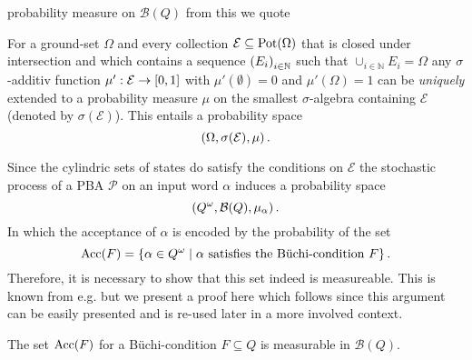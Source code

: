 probability measure on $\mathcal{B}(Q)$ from this we quote
\begin{theorem}
  \cite[Theorem 2.4, Theorem 5.6]{Bauer}
  For a ground-set $\Omega$ and every collection
  $\mathcal{E}\subseteq\operatorname{Pot}(\Omega)$ that is closed under intersection and
  which contains a sequence $\left(E_{i}\right)_{i\in\mathbb{N}}$ such that
  $\cup_{i\in\mathbb{N}}E_{i} = \Omega$ any $\sigma$-additiv function
  $\mu':\mathcal{E}\rightarrow\left[0, 1\right]$
  with $\mu'(\emptyset) = 0$ and $\mu'(\Omega) = 1$ can be \emph{uniquely}
  extended to a probability measure $\mu$ on the smallest $\sigma$-algebra
  containing $\mathcal{E}$ (denoted by $\sigma(\mathcal{E})$). This entails a
  probability space
  \begin{equation*}
    \left(\Omega, \sigma(\mathcal{E}), \mu\right).
  \end{equation*}
  \label{thm:measureext}
\end{theorem}
Since the cylindric sets of states do satisfy the conditions on $\mathcal{E}$
the stochastic process of a \ac{PBA} $\mathcal{P}$ on an input word $\alpha$
induces a probability space
\begin{equation*}
  \left(Q^{\omega}, \mathcal{B}(Q), \mu_{\alpha}\right).
\end{equation*}
In which the acceptance of $\alpha$ is encoded by the probability of the set
\begin{equation*}
  \operatorname{Acc}(F) = \left\{
    \alpha\in Q^{\omega}\mid\alpha\text{ satisfies the Büchi-condition }F\right\}.
\end{equation*}
Therefore, it is necessary to show that this set indeed is measureable. This is
known from e.g. \cite[Chapter 4.1.1.]{Groesser} but we present a proof here
which follows \cite[Proposition 6]{RandAutoInfTrees} since this argument can be
easily presented and is re-used later in a more involved context.
\begin{lemma}[Measurability]
  The set $\operatorname{Acc}(F)$ for a Büchi-condition $F\subseteq Q$ is measurable in 
  $\mathcal{B}(Q)$.
  \label{lem:measureabilityAcceptance}
\end{lemma}
